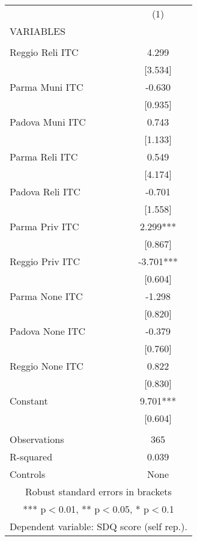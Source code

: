 \begin{tabular}{lc} \hline
 & (1) \\
VARIABLES &  \\ \hline
 &  \\
Reggio Reli ITC & 4.299 \\
 & [3.534] \\
Parma Muni ITC & -0.630 \\
 & [0.935] \\
Padova Muni ITC & 0.743 \\
 & [1.133] \\
Parma Reli ITC & 0.549 \\
 & [4.174] \\
Padova Reli ITC & -0.701 \\
 & [1.558] \\
Parma Priv ITC & 2.299*** \\
 & [0.867] \\
Reggio Priv ITC & -3.701*** \\
 & [0.604] \\
Parma None ITC & -1.298 \\
 & [0.820] \\
Padova None ITC & -0.379 \\
 & [0.760] \\
Reggio None ITC & 0.822 \\
 & [0.830] \\
Constant & 9.701*** \\
 & [0.604] \\
 &  \\
Observations & 365 \\
R-squared & 0.039 \\
 Controls & None \\ \hline
\multicolumn{2}{c}{ Robust standard errors in brackets} \\
\multicolumn{2}{c}{ *** p$<$0.01, ** p$<$0.05, * p$<$0.1} \\
\multicolumn{2}{c}{ Dependent variable: SDQ score (self rep.).} \\
\end{tabular}
